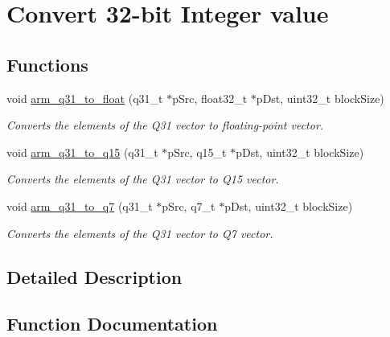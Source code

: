\hypertarget{group__q31__to__x}{}\section{Convert 32-\/bit Integer value}
\label{group__q31__to__x}
\subsection*{Functions}
\begin{DoxyCompactItemize}
\item 
void \hyperlink{group__q31__to__x_gacf407b007a37da18e99dabd9023c56b4}{arm\+\_\+q31\+\_\+to\+\_\+float} (q31\+\_\+t $\ast$p\+Src, float32\+\_\+t $\ast$p\+Dst, uint32\+\_\+t block\+Size)
\begin{DoxyCompactList}\small\item\em Converts the elements of the Q31 vector to floating-\/point vector. \end{DoxyCompactList}\item 
void \hyperlink{group__q31__to__x_ga901dede4661365c9e7c630d3eb31c32c}{arm\+\_\+q31\+\_\+to\+\_\+q15} (q31\+\_\+t $\ast$p\+Src, q15\+\_\+t $\ast$p\+Dst, uint32\+\_\+t block\+Size)
\begin{DoxyCompactList}\small\item\em Converts the elements of the Q31 vector to Q15 vector. \end{DoxyCompactList}\item 
void \hyperlink{group__q31__to__x_ga7f297d1a7d776805395095fdb24a8071}{arm\+\_\+q31\+\_\+to\+\_\+q7} (q31\+\_\+t $\ast$p\+Src, q7\+\_\+t $\ast$p\+Dst, uint32\+\_\+t block\+Size)
\begin{DoxyCompactList}\small\item\em Converts the elements of the Q31 vector to Q7 vector. \end{DoxyCompactList}\end{DoxyCompactItemize}


\subsection{Detailed Description}


\subsection{Function Documentation}
